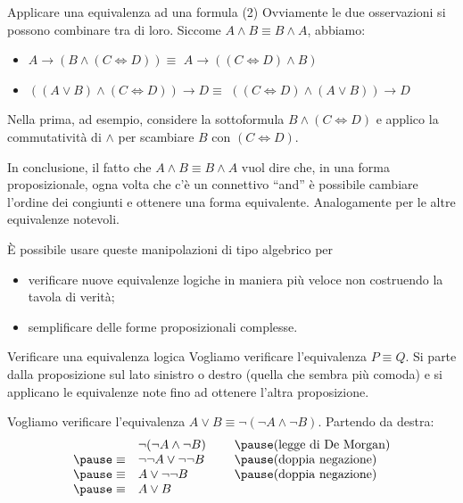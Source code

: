\documentclass[10pt,dvipsnames]{beamer}
\begin{document}
\begin{frame}{Applicare una equivalenza ad una formula (2)}
    Ovviamente le due osservazioni si possono combinare tra di loro. Siccome $A \wedge B \equiv B \wedge A$, abbiamo:
    \begin{itemize}
        \item $A \to (B \wedge (C \iff D))  \equiv$ \pause $A \to ((C \iff D) \wedge B)$ \pause
        \item $((A \vee B) \wedge (C \iff D)) \to D \equiv$ \pause $( (C \iff D) \wedge (A \vee B)) \to D$
    \end{itemize}

    \pause\medskip
    Nella prima, ad esempio, considere la sottoformula $B \wedge (C \iff D)$ e applico la commutatività di $\wedge$ per scambiare $B$ con $(C \iff D)$.

    \pause\medskip
    In conclusione, il fatto che $A \wedge B \equiv B \wedge A$ vuol dire che, in una forma proposizionale, ogna volta che c'è un connettivo ``and'' è possibile cambiare l'ordine dei congiunti e ottenere una forma equivalente. Analogamente per le altre equivalenze notevoli.

    \medskip
    È possibile usare queste manipolazioni di tipo algebrico per
    \begin{itemize}
        \item verificare nuove equivalenze logiche in maniera più veloce non costruendo la tavola di verità;
        \item semplificare delle forme proposizionali complesse.
    \end{itemize}
\end{frame}

\begin{frame}{Verificare una equivalenza logica}
    Vogliamo verificare l'equivalenza $P \equiv Q$.  Si parte dalla proposizione sul lato sinistro o destro (quella che sembra più comoda) e si applicano le equivalenze note fino ad ottenere l'altra proposizione.

    \begin{example}
        Vogliamo verificare l'equivalenza $A \vee B \equiv \neg(\neg A \wedge \neg B)$. Partendo da destra:
        \[
            \begin{array}{rl@{\hspace{0.8cm}}l}
                              & \neg(\neg A \wedge \neg B) & \pause \text{(legge di De Morgan)} \\
                \pause \equiv & \neg\neg A \vee \neg\neg B & \pause \text{(doppia negazione)}   \\
                \pause \equiv & A \vee \neg\neg B          & \pause \text{(doppia negazione)}   \\
                \pause \equiv & A \vee B
            \end{array}
        \]
    \end{example}
\end{frame}
\end{document}
